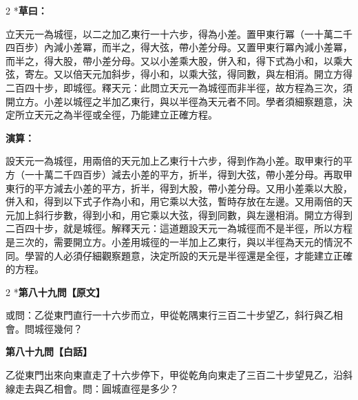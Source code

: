 \documentclass[11pt,a4paper]{article}
\newcommand{\tianyuan}[2]{\raisebox{-0.6ex}{\scriptsize$\begin{array}{c}#1\\\hline #2\end{array}$}}
\begin{document}
\begin{paracol}{2}
\switchcolumn[0]*\textbf{草曰：}

\small 立天元一為城徑，以二之加乙東行一十六步，得\tianyuan{16}{2}為小差。置甲東行冪（一十萬二千四百步）內減小差冪，而半之，得大弦，帶小差分母。又置甲東行冪內減小差冪，而半之，得大股，帶小差分母。又以小差乘大股，併入和，得下式為小和，以乘大弦，寄左。又以倍天元加斜步，得小和，以乘大弦，得同數，與左相消。開立方得二百四十步，即城徑。釋天元：此問立天元一為城徑而非半徑，故方程為三次，須開立方。小差以城徑之半加乙東行，與以半徑為天元者不同。學者須細察題意，決定所立天元之為半徑或全徑，乃能建立正確方程。

\switchcolumn\textbf{演算：}

\small 設天元一為城徑，用兩倍的天元加上乙東行十六步，得到\tianyuan{16}{2}作為小差。取甲東行的平方（一十萬二千四百步）減去小差的平方，折半，得到大弦，帶小差分母。再取甲東行的平方減去小差的平方，折半，得到大股，帶小差分母。又用小差乘以大股，併入和，得到以下式子作為小和，用它乘以大弦，暫時存放在左邊。又用兩倍的天元加上斜行步數，得到小和，用它乘以大弦，得到同數，與左邊相消。開立方得到二百四十步，就是城徑。解釋天元：這道題設天元一為城徑而不是半徑，所以方程是三次的，需要開立方。小差用城徑的一半加上乙東行，與以半徑為天元的情況不同。學習的人必須仔細觀察題意，決定所設的天元是半徑還是全徑，才能建立正確的方程。
\end{paracol}

\vspace{0.1cm}
\noindent{}
\par\vspace{0.3cm}

\begin{paracol}{2}
\switchcolumn[0]*\noindent\textbf{第八十九問【原文】}

\small 或問：乙從東門直行一十六步而立，甲從乾隅東行三百二十步望乙，斜行與乙相會。問城徑幾何？

\switchcolumn\noindent\textbf{第八十九問【白話】}

\small 乙從東門出來向東直走了十六步停下，甲從乾角向東走了三百二十步望見乙，沿斜線走去與乙相會。問：圓城直徑是多少？
\end{paracol}

\vspace{0.1cm}
\noindent{}
\par\vspace{0.15cm}
\end{document}

